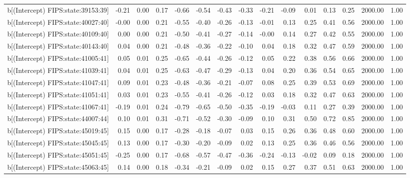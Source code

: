 \begin{table}[ht]
\begin{tabular}{rrrrrrrrrrrrrrr}
  b[(Intercept) FIPS:state:39153:39] & -0.21 & 0.00 & 0.17 & -0.66 & -0.54 & -0.43 & -0.33 & -0.21 & -0.09 & 0.01 & 0.13 & 0.25 & 2000.00 & 1.00 \\ 
  b[(Intercept) FIPS:state:40027:40] & -0.00 & 0.00 & 0.21 & -0.55 & -0.40 & -0.26 & -0.13 & -0.01 & 0.13 & 0.25 & 0.41 & 0.56 & 2000.00 & 1.00 \\ 
  b[(Intercept) FIPS:state:40109:40] & 0.00 & 0.00 & 0.21 & -0.50 & -0.41 & -0.27 & -0.14 & -0.00 & 0.14 & 0.27 & 0.42 & 0.55 & 2000.00 & 1.00 \\ 
  b[(Intercept) FIPS:state:40143:40] & 0.04 & 0.00 & 0.21 & -0.48 & -0.36 & -0.22 & -0.10 & 0.04 & 0.18 & 0.32 & 0.47 & 0.59 & 2000.00 & 1.00 \\ 
  b[(Intercept) FIPS:state:41005:41] & 0.05 & 0.01 & 0.25 & -0.65 & -0.44 & -0.26 & -0.12 & 0.05 & 0.22 & 0.38 & 0.56 & 0.66 & 2000.00 & 1.00 \\ 
  b[(Intercept) FIPS:state:41039:41] & 0.04 & 0.01 & 0.25 & -0.63 & -0.47 & -0.29 & -0.13 & 0.04 & 0.20 & 0.36 & 0.54 & 0.65 & 2000.00 & 1.00 \\ 
  b[(Intercept) FIPS:state:41047:41] & 0.09 & 0.01 & 0.23 & -0.48 & -0.36 & -0.21 & -0.07 & 0.08 & 0.25 & 0.39 & 0.53 & 0.69 & 2000.00 & 1.00 \\ 
  b[(Intercept) FIPS:state:41051:41] & 0.03 & 0.01 & 0.23 & -0.55 & -0.41 & -0.26 & -0.12 & 0.03 & 0.18 & 0.32 & 0.47 & 0.63 & 2000.00 & 1.00 \\ 
  b[(Intercept) FIPS:state:41067:41] & -0.19 & 0.01 & 0.24 & -0.79 & -0.65 & -0.50 & -0.35 & -0.19 & -0.03 & 0.11 & 0.27 & 0.39 & 2000.00 & 1.00 \\ 
  b[(Intercept) FIPS:state:44007:44] & 0.10 & 0.01 & 0.31 & -0.71 & -0.52 & -0.30 & -0.09 & 0.10 & 0.31 & 0.50 & 0.72 & 0.85 & 2000.00 & 1.00 \\ 
  b[(Intercept) FIPS:state:45019:45] & 0.15 & 0.00 & 0.17 & -0.28 & -0.18 & -0.07 & 0.03 & 0.15 & 0.26 & 0.36 & 0.48 & 0.60 & 2000.00 & 1.00 \\ 
  b[(Intercept) FIPS:state:45045:45] & 0.13 & 0.00 & 0.17 & -0.30 & -0.20 & -0.09 & 0.02 & 0.13 & 0.25 & 0.36 & 0.46 & 0.56 & 2000.00 & 1.00 \\ 
  b[(Intercept) FIPS:state:45051:45] & -0.25 & 0.00 & 0.17 & -0.68 & -0.57 & -0.47 & -0.36 & -0.24 & -0.13 & -0.02 & 0.09 & 0.18 & 2000.00 & 1.00 \\ 
  b[(Intercept) FIPS:state:45063:45] & 0.14 & 0.00 & 0.18 & -0.34 & -0.21 & -0.09 & 0.02 & 0.15 & 0.27 & 0.37 & 0.51 & 0.63 & 2000.00 & 1.00 \\ 

\end{tabular}
\end{table}
